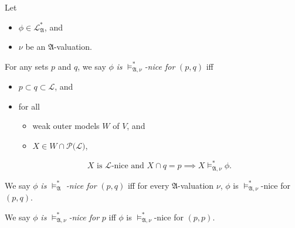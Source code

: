 \documentclass[12pt]{article}
\numberwithin{equation}{section}
\begin{document}
\begin{defi}
Let 
\begin{itemize}
    \item $\phi \in \mathcal{L}^{*}_{\mathfrak{A}}$, and
    \item $\nu$ be an $\mathfrak{A}$-valuation.
\end{itemize}
For any sets $p$ and $q$, we say $\phi$ \emph{is} $\models^*_{\mathfrak{A}, \nu}$\emph{-nice for} $(p, q)$ iff 
\begin{itemize}
    \item $p \subset q \subset \mathcal{L}$, and
    \item for all 
    \begin{itemize}[label=$\circ$]
        \item weak outer models $W$ of $V$, and
        \item $X \in W \cap \mathcal{P}(\mathcal{L)}$, 
    \end{itemize}
    $$X \text{ is } \mathcal{L} \text{-nice and } X \cap q = p \implies X \models^*_{\mathfrak{A}, \nu} \phi.$$
\end{itemize}

We say $\phi$ \emph{is} $\models^*_{\mathfrak{A}}$ \emph{-nice for} $(p, q)$ iff for every $\mathfrak{A}$-valuation $\nu$, $\phi$ is $\models^*_{\mathfrak{A}, \nu}$-nice for $(p, q)$.

We say $\phi$ \emph{is} $\models^*_{\mathfrak{A}, \nu}$\emph{-nice for} $p$ iff $\phi$ is $\models^*_{\mathfrak{A}, \nu}$-nice for $(p, p)$.
\end{defi}
\end{document}
